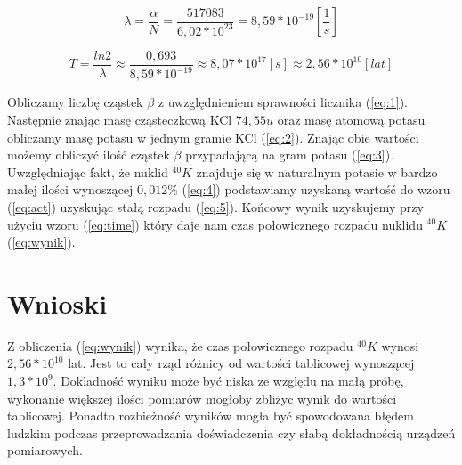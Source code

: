 \documentclass[a4paper,11pt]{extarticle}
\begin{document}
  \begin{equation}
    \lambda = \dfrac{\alpha}{N} = \dfrac{517083}{6,02 * 10^{23}} = 8,59 * 10^{-19} \left[ \dfrac{1}{s} \right]
    \label{eq:5}
  \end{equation}

  \begin{equation}
    T = \dfrac{ln 2}{\lambda} \approx \dfrac{0,693}{8,59 * 10^{-19}} \approx 8,07 * 10^{17} [s] \approx 2,56 * 10^{10} [lat]
    \label{eq:wynik}
  \end{equation}

  Obliczamy liczbę cząstek \( \beta \) z uwzględnieniem sprawności licznika
  (\ref{eq:1}). Następnie znając masę cząsteczkową KCl \( 74,55u \) oraz masę
  atomową potasu obliczamy masę potasu w jednym gramie KCl (\ref{eq:2}).
  Znając obie wartości możemy obliczyć ilość cząstek \( \beta \) przypadającą na
  gram potasu (\ref{eq:3}). Uwzględniając fakt, że nuklid \( ^{40}K \) znajduje
  się w naturalnym potasie w bardzo małej ilości wynoszącej \( 0,012\% \)
  (\ref{eq:4}) podstawiamy uzyskaną wartość do wzoru (\ref{eq:act}) uzyskując
  stałą rozpadu (\ref{eq:5}). Końcowy wynik uzyskujemy przy użyciu wzoru (\ref{eq:time})
  który daje nam czas połowicznego rozpadu nuklidu \( ^{40}K \) (\ref{eq:wynik}).

  \section{Wnioski}
  Z obliczenia (\ref{eq:wynik}) wynika, że czas połowicznego rozpadu \( ^{40}K \)
  wynosi \( 2,56 * 10^{10} \) lat. Jest to cały rząd różnicy od wartości tablicowej
  wynoszącej \( 1,3 * 10^9 \). Dokladność wyniku może być niska ze względu na małą
  próbę, wykonanie większej ilości pomiarów mogłoby zbliżyc wynik do wartości
  tablicowej. Ponadto rozbieżność wyników mogła być spowodowana błędem ludzkim
  podczas przeprowadzania doświadczenia czy słabą dokładnością urządzeń pomiarowych.
\end{document}
